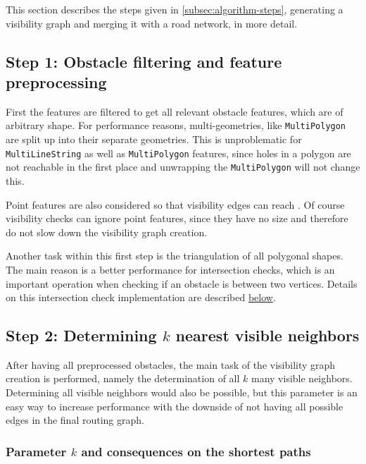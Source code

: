	This section describes the steps given in \cref{subsec:algorithm-steps}, generating a visibility graph and merging it with a road network, in more detail.

	\subsection{Step 1: Obstacle filtering and feature preprocessing}
	\label{subsec:step-1-preprocessing}
			
			First the features are filtered to get all relevant obstacle features, which are of arbitrary shape.
			For performance reasons, multi-geometries, like \texttt{MultiPolygon} are split up into their separate geometries.
			This is unproblematic for \texttt{MultiLineString} as well as \texttt{MultiPolygon} features, since holes in a polygon are not reachable in the first place and unwrapping the \texttt{MultiPolygon} will not change this.
			
			Point features are also considered so that visibility edges can reach .
			Of course visibility checks can ignore point features, since they have no size and therefore do not slow down the visibility graph creation.
			
			Another task within this first step is the triangulation of all polygonal shapes.
			The main reason is a better performance for intersection checks, which is an important operation when checking if an obstacle is between two vertices.
			Details on this intersection check implementation are described \hyperref[subsubsec:intersection-checks]{below}.
			
	\subsection{Step 2: Determining $k$ nearest visible neighbors}
			
			After having all preprocessed obstacles, the main task of the visibility graph creation is performed, namely the determination of all $k$ many visible neighbors.
			Determining all visible neighbors would also be possible, but this parameter is an easy way to increase performance with the downside of not having all possible edges in the final routing graph.
			
			\subsubsection{Parameter $k$ and consequences on the shortest paths}
			
